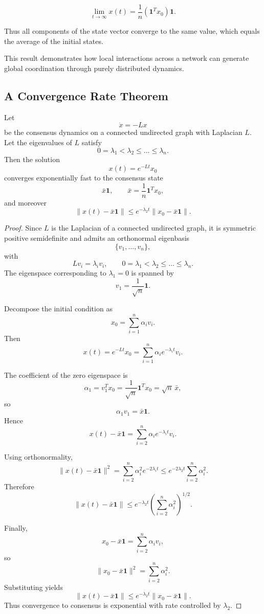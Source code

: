 \documentclass[12pt]{article}
\begin{document}
\[
\lim_{t \to \infty} x(t)
=
\frac{1}{n}(\mathbf{1}^T x_0)\mathbf{1}.
\]

Thus all components of the state vector converge to the same value, which equals the average of the initial states.

This result demonstrates how local interactions across a network can generate global coordination through purely distributed dynamics.

\subsection{A Convergence Rate Theorem}

\begin{theorem}
Let
\[
\dot{x} = -Lx
\]
be the consensus dynamics on a connected undirected graph with Laplacian $L$. Let the eigenvalues of $L$ satisfy
\[
0 = \lambda_1 < \lambda_2 \le \dots \le \lambda_n .
\]
Then the solution
\[
x(t) = e^{-Lt}x_0
\]
converges exponentially fast to the consensus state
\[
\bar{x}\mathbf{1},
\qquad
\bar{x} = \frac{1}{n}\mathbf{1}^T x_0,
\]
and moreover
\[
\|x(t)-\bar{x}\mathbf{1}\|
\le
e^{-\lambda_2 t}\|x_0-\bar{x}\mathbf{1}\|.
\]
\end{theorem}

\begin{proof}
Since $L$ is the Laplacian of a connected undirected graph, it is symmetric positive semidefinite and admits an orthonormal eigenbasis
\[
\{v_1,\dots,v_n\},
\]
with
\[
Lv_i = \lambda_i v_i,
\qquad
0=\lambda_1<\lambda_2\le\dots\le\lambda_n.
\]
The eigenspace corresponding to $\lambda_1=0$ is spanned by
\[
v_1 = \frac{1}{\sqrt{n}}\mathbf{1}.
\]

Decompose the initial condition as
\[
x_0 = \sum_{i=1}^n \alpha_i v_i.
\]
Then
\[
x(t)=e^{-Lt}x_0=\sum_{i=1}^n \alpha_i e^{-\lambda_i t} v_i.
\]

The coefficient of the zero eigenspace is
\[
\alpha_1 = v_1^T x_0
= \frac{1}{\sqrt{n}}\mathbf{1}^T x_0
= \sqrt{n}\,\bar{x},
\]
so
\[
\alpha_1 v_1 = \bar{x}\mathbf{1}.
\]
Hence
\[
x(t)-\bar{x}\mathbf{1}
=
\sum_{i=2}^n \alpha_i e^{-\lambda_i t} v_i.
\]

Using orthonormality,
\[
\|x(t)-\bar{x}\mathbf{1}\|^2
=
\sum_{i=2}^n \alpha_i^2 e^{-2\lambda_i t}
\le
e^{-2\lambda_2 t}\sum_{i=2}^n \alpha_i^2.
\]
Therefore
\[
\|x(t)-\bar{x}\mathbf{1}\|
\le
e^{-\lambda_2 t}
\left(\sum_{i=2}^n \alpha_i^2\right)^{1/2}.
\]

Finally,
\[
x_0-\bar{x}\mathbf{1}=\sum_{i=2}^n \alpha_i v_i,
\]
so
\[
\|x_0-\bar{x}\mathbf{1}\|^2=\sum_{i=2}^n \alpha_i^2.
\]
Substituting yields
\[
\|x(t)-\bar{x}\mathbf{1}\|
\le
e^{-\lambda_2 t}\|x_0-\bar{x}\mathbf{1}\|.
\]
Thus convergence to consensus is exponential with rate controlled by $\lambda_2$.
\end{proof}
\end{document}
